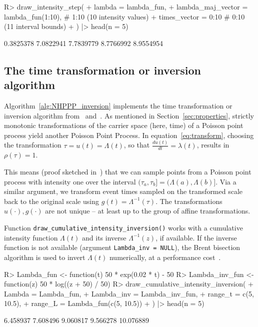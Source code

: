 \documentclass[10pt,letterpaper]{article}
\newcommand{\fct}[1]{\texttt{#1()}}
\newcommand{\der}[2]{\frac{d {#1}} {d{#2}}}
\begin{document}
\begin{Schunk}
\begin{Sinput}
R> draw_intensity_step(
+    lambda = lambda_fun,
+    lambda_maj_vector = lambda_fun(1:10), # 1:10 (10 intensity values)
+    times_vector = 0:10 # 0:10 (11 interval bounds)
+  ) |> head(n = 5)
\end{Sinput}
\begin{Soutput}
[1] 0.3825378 7.0822941 7.7839779 8.7766992 8.9554954
\end{Soutput}
\end{Schunk}

\subsection{The time transformation or inversion algorithm}\label{sec:inversion}
Algorithm~\ref{alg:NHPPP_inversion} implements the time transformation or inversion algorithm from~\cite{Cinlar1975inversion} and~\cite[par. 4.2]{cox1965theory}. As mentioned in Section~\ref{sec:properties}, strictly monotonic transformations of the carrier space (here, time) of a Poisson point process yield another Poisson Point Process. In equation~\eqref{eq:transform}, choosing the transformation $\tau = u(t) = \Lambda(t)$, so that $\der{u(t)}{t} = \lambda(t)$, results in $\rho(\tau) = 1$.

This means (proof sketched in~\cite[par. 4.2]{cox1965theory}) that we can sample points from a Poisson point process with intensity one over the interval $(\tau_a, \tau_b] = (\Lambda(a), \Lambda(b)]$. Via a similar argument, we transform event times sampled on the transformed scale back to the original scale using $g(t)=\Lambda^{-1}(\tau)$. The transformations $u(\cdot), g(\cdot)$ are not unique -- at least up to the group of affine transformations.

Function \fct{draw\_cumulative\_intensity\_inversion} works with a cumulative intensity function $\Lambda(t)$ and its inverse $\Lambda^{-1}(z)$, if available. If the inverse function is not available (argument \texttt{Lambda\_inv = NULL}), the Brent bisection algorithm is used to invert $\Lambda(t)$ numerically, at a performance cost~\cite{brent-bisection}.

\begin{Schunk}
\begin{Sinput}
R> Lambda_fun <- function(t) 50 * exp(0.02 * t) - 50
R> Lambda_inv_fun <- function(z) 50 * log((z + 50) / 50)
R> draw_cumulative_intensity_inversion(
+    Lambda = Lambda_fun,
+    Lambda_inv = Lambda_inv_fun,
+    range_t = c(5, 10.5),
+    range_L = Lambda_fun(c(5, 10.5))
+  ) |> head(n = 5)
\end{Sinput}
\begin{Soutput}
[1]  6.458937  7.608496  9.060817  9.566278 10.076889
\end{Soutput}
\end{Schunk}
\end{document}
